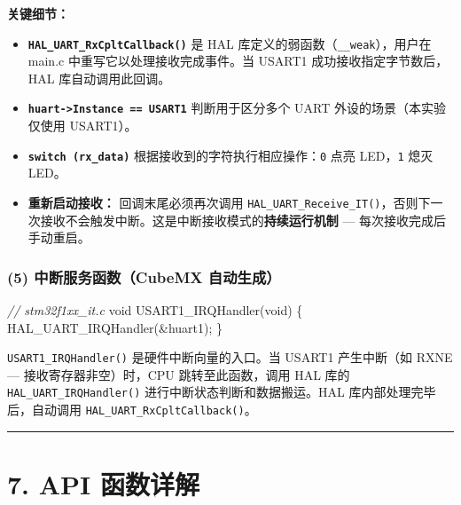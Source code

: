 \documentclass[
  chinese,
  UTF8,
  oneside,
  openany]{ctexbook}
\newenvironment{Shaded}{}{}
\newcommand{\CommentTok}[1]{\textcolor[rgb]{0.38,0.63,0.69}{\textit{#1}}}
\newcommand{\DataTypeTok}[1]{\textcolor[rgb]{0.56,0.13,0.00}{#1}}
\newcommand{\NormalTok}[1]{#1}
\newcommand{\OperatorTok}[1]{\textcolor[rgb]{0.40,0.40,0.40}{#1}}
\providecommand{\tightlist}{%
  \setlength{\itemsep}{0pt}\setlength{\parskip}{0pt}}
\begin{document}
\textbf{关键细节：}

\begin{itemize}
\tightlist
\item
  \textbf{\texttt{HAL\_UART\_RxCpltCallback()}} 是 HAL
  库定义的弱函数（\texttt{\_\_weak}），用户在 main.c
  中重写它以处理接收完成事件。当 USART1 成功接收指定字节数后，HAL
  库自动调用此回调。
\item
  \textbf{\texttt{huart-\textgreater{}Instance\ ==\ USART1}}
  判断用于区分多个 UART 外设的场景（本实验仅使用 USART1）。
\item
  \textbf{\texttt{switch\ (rx\_data)}}
  根据接收到的字符执行相应操作：\texttt{\textquotesingle{}0\textquotesingle{}}
  点亮 LED，\texttt{\textquotesingle{}1\textquotesingle{}} 熄灭 LED。
\item
  \textbf{重新启动接收：} 回调末尾必须再次调用
  \texttt{HAL\_UART\_Receive\_IT()}，否则下一次接收不会触发中断。这是中断接收模式的\textbf{持续运行机制}
  --- 每次接收完成后手动重启。
\end{itemize}

\subsubsection{(5) 中断服务函数（CubeMX
自动生成）}\label{ux4e2dux65adux670dux52a1ux51fdux6570cubemx-ux81eaux52a8ux751fux6210}

\begin{Shaded}
\begin{Highlighting}[]
\CommentTok{// stm32f1xx\_it.c}
\DataTypeTok{void}\NormalTok{ USART1\_IRQHandler}\OperatorTok{(}\DataTypeTok{void}\OperatorTok{)}
\OperatorTok{\{}
\NormalTok{    HAL\_UART\_IRQHandler}\OperatorTok{(\&}\NormalTok{huart1}\OperatorTok{);}
\OperatorTok{\}}
\end{Highlighting}
\end{Shaded}

\texttt{USART1\_IRQHandler()} 是硬件中断向量的入口。当 USART1
产生中断（如 RXNE --- 接收寄存器非空）时，CPU 跳转至此函数，调用 HAL
库的 \texttt{HAL\_UART\_IRQHandler()} 进行中断状态判断和数据搬运。HAL
库内部处理完毕后，自动调用 \texttt{HAL\_UART\_RxCpltCallback()}。

\begin{center}\rule{0.5\linewidth}{0.5pt}\end{center}

\section{7. API 函数详解}\label{api-ux51fdux6570ux8be6ux89e3-1}
\end{document}

